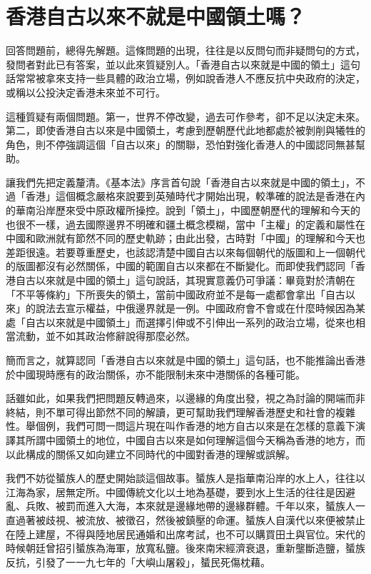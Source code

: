 \section{香港自古以來不就是中國領土嗎？}
回答問題前，總得先解題。這條問題的出現，往往是以反問句而非疑問句的方式，發問者對此已有答案，並以此來質疑別人。「香港自古以來就是中國的領土」這句話常常被拿來支持一些具體的政治立場，例如說香港人不應反抗中央政府的決定，或稱以公投決定香港未來並不可行。

這種質疑有兩個問題。第一，世界不停改變，過去可作參考，卻不足以決定未來。第二，即使香港自古以來是中國領土，考慮到歷朝歷代此地都處於被剝削與犧牲的角色，則不停強調這個「自古以來」的關聯，恐怕對強化香港人的中國認同無甚幫助。

讓我們先把定義釐清。《基本法》序言首句說「香港自古以來就是中國的領土」，不過「香港」這個概念嚴格來說要到英殖時代才開始出現，較準確的說法是香港在內的華南沿岸歷來受中原政權所操控。說到「領土」，中國歷朝歷代的理解和今天的也很不一樣，過去國際邊界不明確和疆土概念模糊，當中「主權」的定義和屬性在中國和歐洲就有節然不同的歷史軌跡；由此出發，古時對「中國」的理解和今天也差距很遠。若要尊重歷史，也該認清楚中國自古以來每個朝代的版圖和上一個朝代的版圖都沒有必然關係，中國的範圍自古以來都在不斷變化。而即使我們認同「香港自古以來就是中國的領土」這句說話，其現實意義仍可爭議：畢竟對於清朝在「不平等條約」下所喪失的領土，當前中國政府並不是每一處都會拿出「自古以來」的說法去宣示權益，中俄邊界就是一例。中國政府會不會或在什麼時候因為某處「自古以來就是中國領土」而選擇引伸或不引伸出一系列的政治立場，從來也相當流動，並不如其政治修辭說得那麼必然。

簡而言之，就算認同「香港自古以來就是中國的領土」這句話，也不能推論出香港於中國現時應有的政治關係，亦不能限制未來中港關係的各種可能。

話雖如此，如果我們把問題反轉過來，以邊緣的角度出發，視之為討論的開端而非終結，則不單可得出節然不同的解讀，更可幫助我們理解香港歷史和社會的複雜性。舉個例，我們可問一問這片現在叫作香港的地方自古以來是在怎樣的意義下演譯其所謂中國領土的地位，中國自古以來是如何理解這個今天稱為香港的地方，而以此構成的關係又如向建立不同時代的中國對香港的理解或誤解。

我們不妨從蜑族人的歷史開始談這個故事。蜑族人是指華南沿岸的水上人，往往以江海為家，居無定所。中國傳統文化以土地為基礎，要到水上生活的往往是因避亂、兵敗、被罰而進入大海，本來就是邊緣地帶的邊緣群體。千年以來，蜑族人一直過著被歧視、被流放、被徵召，然後被鎮壓的命運。蜑族人自漢代以來便被禁止在陸上建屋，不得與陸地居民通婚和出席考試，也不可以購買田土與官位。宋代的時候朝廷曾招引蜑族為海軍，放寬私鹽。後來南宋經濟衰退，重新壟斷造鹽，蜑族反抗，引發了一一九七年的「大嶼山屠殺」，蜑民死傷枕藉。

